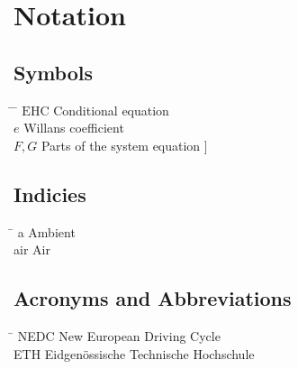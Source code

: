 
\chapter*{Notation}\label{chap:symbole}

\section*{Symbols}
\begin{tabbing}
 \hspace*{1.6cm} \= \hspace*{8cm} \= \kill
 $\mathrm{EHC}$ \> Conditional equation \> [$-$] \\[0.5ex]
 $e$ \> Willans coefficient \> [$-$] \\[0.5ex]
 $F,G$ \> Parts of the system equation \> [\unitfrac[]{K}{s}]
\end{tabbing}

\section*{Indicies}
\begin{tabbing}
 \hspace*{1.6cm}  \= \kill
 a \> Ambient \\[0.5ex]
 air \> Air
\end{tabbing}

\section*{Acronyms and Abbreviations}
\begin{tabbing}
 \hspace*{1.6cm}  \= \kill
 NEDC \> New European Driving Cycle \\[0.5ex]
 ETH \> Eidgen\"{o}ssische Technische Hochschule
\end{tabbing}

 \cleardoublepage

